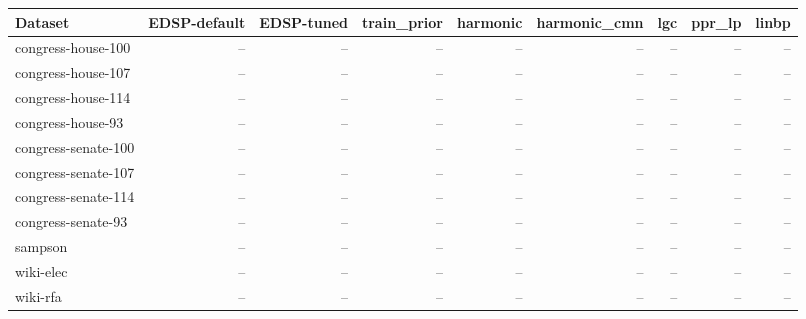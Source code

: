 \begin{tabular}{lrrrrrrrr}
\toprule
Dataset & EDSP-default & EDSP-tuned & train\_prior & harmonic & harmonic\_cmn & lgc & ppr\_lp & linbp \\
\midrule
congress-house-100 & -- & -- & -- & -- & -- & -- & -- & -- \\
congress-house-107 & -- & -- & -- & -- & -- & -- & -- & -- \\
congress-house-114 & -- & -- & -- & -- & -- & -- & -- & -- \\
congress-house-93 & -- & -- & -- & -- & -- & -- & -- & -- \\
congress-senate-100 & -- & -- & -- & -- & -- & -- & -- & -- \\
congress-senate-107 & -- & -- & -- & -- & -- & -- & -- & -- \\
congress-senate-114 & -- & -- & -- & -- & -- & -- & -- & -- \\
congress-senate-93 & -- & -- & -- & -- & -- & -- & -- & -- \\
sampson & -- & -- & -- & -- & -- & -- & -- & -- \\
wiki-elec & -- & -- & -- & -- & -- & -- & -- & -- \\
wiki-rfa & -- & -- & -- & -- & -- & -- & -- & -- \\
\bottomrule
\end{tabular}
